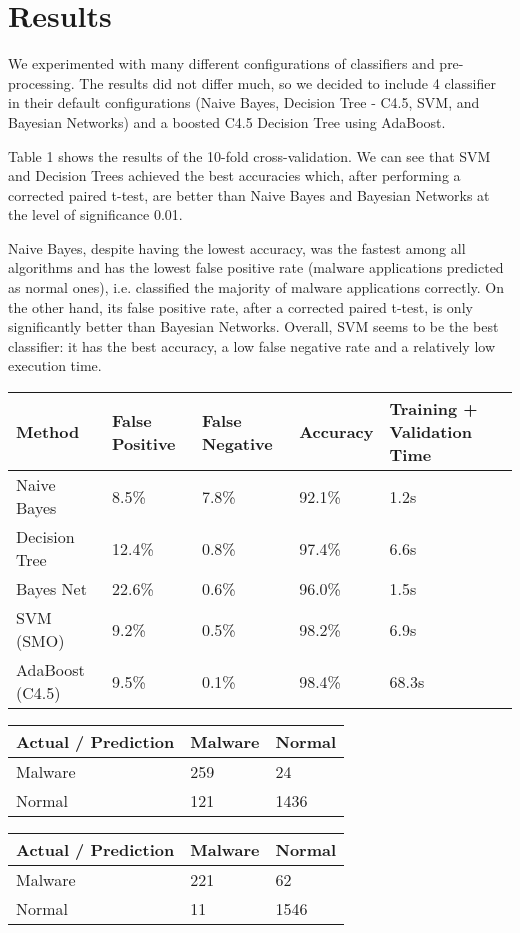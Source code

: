 \section{Results}
We experimented with many different configurations of classifiers and pre-processing. The results did not differ much, so we decided to include 4 classifier in their default configurations (Naive Bayes, Decision Tree - C4.5, SVM, and Bayesian Networks) and a boosted C4.5 Decision Tree using AdaBoost.

Table 1 shows the results of the 10-fold cross-validation. We can see that SVM and Decision Trees achieved the best accuracies which, after performing a corrected paired t-test, are better than Naive Bayes and Bayesian Networks at the level of significance 0.01.

Naive Bayes, despite having the lowest accuracy, was the fastest among all algorithms and has the lowest false positive rate (malware applications predicted as normal ones), i.e. classified the majority of malware applications correctly. On the other hand, its false positive rate, after a corrected paired t-test, is only significantly better than Bayesian Networks. Overall, SVM seems to be the best classifier: it has the best accuracy, a low false negative rate and a relatively low execution time.
\begin{tabular}{|l|l l l l|}
\hline
Method & False Positive & False Negative & Accuracy & Training + Validation Time \\
\hline
Naive Bayes & 8.5\% & 7.8\% & 92.1\% & 1.2s \\
Decision Tree & 12.4\% & 0.8\% & 97.4\% & 6.6s \\
Bayes Net & 22.6\% & 0.6\% & 96.0\% & 1.5s \\
SVM (SMO) & 9.2\% & 0.5\% & 98.2\% & 6.9s \\
AdaBoost (C4.5) & 9.5\% & 0.1\% & 98.4\% & 68.3s \\
\hline
\end{tabular}
\begin{tabular}{|l|l l|}
\hline
Actual / Prediction & Malware & Normal \\
\hline
Malware & 259 & 24 \\
Normal & 121 & 1436 \\
\hline
\end{tabular}
\begin{tabular}{|l|l l|}
\hline
Actual / Prediction & Malware & Normal \\
\hline
Malware & 221 & 62 \\
Normal & 11 & 1546 \\
\hline
\end{tabular}
